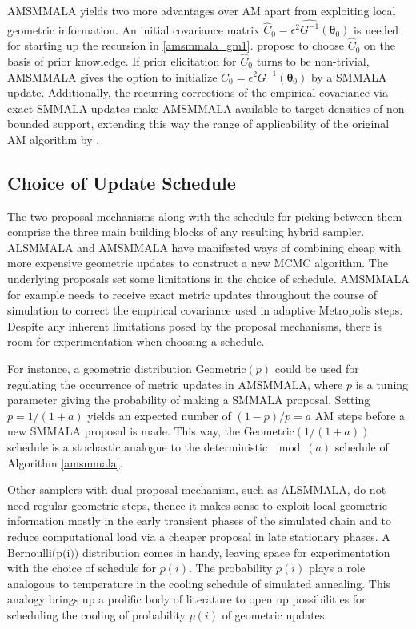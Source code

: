 \documentclass[twoside,11pt]{article}
\begin{document}
AMSMMALA yields two more advantages over AM apart from exploiting local geometric information. An initial covariance matrix
$\hat{C}_0=\epsilon^2\widehat{G^{-1}}(\boldsymbol{\theta}_{0})$ is needed for starting up the recursion in
\eqref{amsmmala_gm1}. \cite{haa_sak_tam__ana} propose to choose $\hat{C}_0$ on the basis of prior knowledge. If prior 
elicitation for $\hat{C}_0$ turns to be non-trivial, AMSMMALA gives the option to initialize $C_0=\epsilon^2 
G^{-1}(\boldsymbol{\theta}_{0})$ by a SMMALA update. Additionally, the recurring corrections of the empirical covariance via 
exact SMMALA updates make AMSMMALA available to target densities of non-bounded support, extending this way the range of 
applicability of the original AM algorithm by \cite{haa_sak_tam__ana}. 

\subsection{Choice of Update Schedule}

The two proposal mechanisms along with the schedule for picking between them comprise the three main building blocks of any
resulting hybrid sampler. ALSMMALA and AMSMMALA have manifested ways of combining cheap with more expensive geometric updates
to construct a new MCMC algorithm. The underlying proposals set some limitations in the choice of schedule. AMSMMALA for
example needs to receive exact metric updates throughout the course of simulation to correct the empirical covariance used in
adaptive Metropolis steps. Despite any inherent limitations posed by the proposal mechanisms, there is room for 
experimentation when choosing a schedule.

For instance, a geometric distribution $\mbox{Geometric}(p)$ could be used for regulating the occurrence of metric updates 
in AMSMMALA, where $p$ is a tuning parameter giving the probability of making a SMMALA proposal. Setting $p=1/(1+a)$ yields 
an expected number of $(1-p)/p=a$ AM steps before a new SMMALA proposal is made. This way, the $\mbox{Geometric}(1/(1+a))$ 
schedule is a stochastic analogue to the deterministic $\mod{(a)}$ schedule of Algorithm \ref{amsmmala}.

Other samplers with dual proposal mechanism, such as ALSMMALA, do not need regular geometric steps, thence it makes sense to 
exploit local geometric information mostly in the early transient phases of the simulated chain and to reduce computational 
load via a cheaper proposal in late stationary phases. A $\mbox{Bernoulli(p(i))}$ distribution comes in handy, leaving space 
for experimentation with the choice of schedule for $p(i)$. The probability $p(i)$ plays a role analogous to temperature in 
the cooling schedule of simulated annealing. This analogy brings up a prolific body of literature to open up possibilities 
for scheduling the cooling of probability $p(i)$ of geometric updates.
\end{document}
